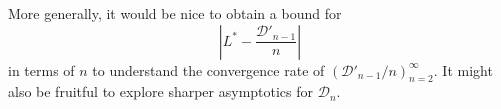 \documentclass[12pt]{amsart}
\theoremstyle{definition}
\begin{document}
More generally, it would be nice to obtain a bound for 
\[\left|L^*-\frac{\mathcal{D}'_{n-1}}{n}\right|\]
in terms of $n$ to understand the convergence rate of $(\mathcal{D}'_{n-1}/n)_{n=2}^{\infty}$. It might also be fruitful to explore sharper asymptotics for $\mathcal{D}_n$.



\end{document}
